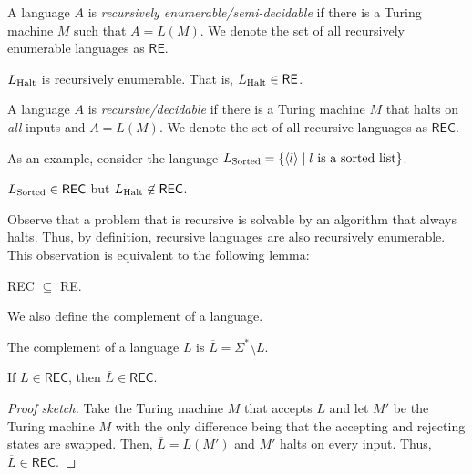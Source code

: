 \documentclass[11pt,usenames, dvipsnames]{article}
\begin{document}
\begin{definition}
  A language $A$ is \emph{recursively enumerable/semi-decidable} if there is a Turing machine $M$ such that $A = L(M)$. We denote the set of all recursively enumerable languages as $\textsf{RE}$.
\end{definition}

\begin{example}
  $L\textsubscript{Halt}$ is recursively enumerable. That is, $L\textsubscript{Halt} \in \textsf{RE}$.
\end{example}

\begin{definition}
  A language $A$ is \emph{recursive/decidable} if there is a Turing machine $M$ that halts on \emph{all} inputs and $A = L(M)$. We denote the set of all recursive languages as $\textsf{REC}$.
\end{definition}

As an example, consider the language $L\textsubscript{Sorted} = \{\langle l \rangle \mid l \text{ is a sorted list}\}$.

\begin{example}
  $L\textsubscript{Sorted} \in \textsf{REC}$ but $L\textsubscript{Halt} \not\in \textsf{REC}$.
\end{example}

Observe that a problem that is recursive is solvable by an algorithm that always halts. Thus, by definition, recursive languages are also recursively enumerable. This observation is equivalent to the following lemma:

\begin{lemma}
  \textsf{REC} $\subseteq$ \textsf{RE}.
\end{lemma}

We also define the complement of a language.

\begin{definition}
  The complement of a language $L$ is $\overline{L} = \Sigma^* \setminus L$.
\end{definition}

\begin{theorem}
  If $L \in \textsf{REC}$, then $\overline{L} \in \textsf{REC}$.
\end{theorem}

\begin{proof}[Proof sketch]
  Take the Turing machine $M$ that accepts $L$ and let $M'$ be the Turing machine $M$ with the only difference being that the accepting and rejecting states are swapped. Then, $\overline{L} = L(M')$ and $M'$ halts on every input. Thus, $\overline{L} \in \textsf{REC}$.
\end{proof}
\end{document}
